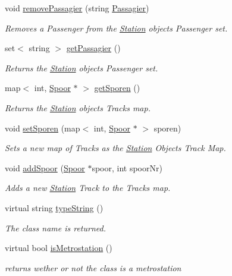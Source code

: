 \begin{DoxyCompactItemize}
void \hyperlink{classStation_aa250b3ba3e62c3d433b4c29f6cca38d4}{remove\+Passagier} (string \hyperlink{classPassagier}{Passagier})
\begin{DoxyCompactList}\small\item\em Removes a Passenger from the \hyperlink{classStation}{Station} object\textquotesingle{}s Passenger set. \end{DoxyCompactList}\item 
set$<$ string $>$ \hyperlink{classStation_a3c25e627a9036778a4d6d08ca1454aa6}{get\+Passagier} ()
\begin{DoxyCompactList}\small\item\em Returns the \hyperlink{classStation}{Station} object\textquotesingle{}s Passenger set. \end{DoxyCompactList}\item 
map$<$ int, \hyperlink{classSpoor}{Spoor} $\ast$ $>$ \hyperlink{classStation_a8ee617b13d4d67d0d3d1384d6d33226f}{get\+Sporen} ()
\begin{DoxyCompactList}\small\item\em Returns the \hyperlink{classStation}{Station} object\textquotesingle{}s Tracks map. \end{DoxyCompactList}\item 
void \hyperlink{classStation_a036804467eb7a7c3bf51a90b4ee57eee}{set\+Sporen} (map$<$ int, \hyperlink{classSpoor}{Spoor} $\ast$ $>$ sporen)
\begin{DoxyCompactList}\small\item\em Sets a new map of Tracks as the \hyperlink{classStation}{Station} Object\textquotesingle{}s Track Map. \end{DoxyCompactList}\item 
void \hyperlink{classStation_a55911b5e0a355f085afd75391827729f}{add\+Spoor} (\hyperlink{classSpoor}{Spoor} $\ast$spoor, int spoor\+Nr)
\begin{DoxyCompactList}\small\item\em Adds a new \hyperlink{classStation}{Station} Track to the Tracks map. \end{DoxyCompactList}\item 
virtual string \hyperlink{classStation_ad83c424982c3e8e85d446593cc833141}{type\+String} ()
\begin{DoxyCompactList}\small\item\em The class\textquotesingle{} name is returned. \end{DoxyCompactList}\item 
virtual bool \hyperlink{classStation_a6c9833b35ffe26df4a0b163c9186be07}{is\+Metrostation} ()
\begin{DoxyCompactList}\small\item\em returns wether or not the class is a metrostation \end{DoxyCompactList}\end{DoxyCompactItemize}


